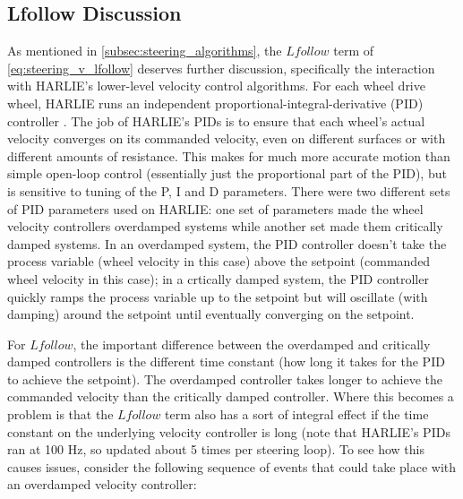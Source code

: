 \subsection{Lfollow Discussion}\label{subsec:lfollow_discussion_steering}

As mentioned in \autoref{subsec:steering_algorithms}, the $Lfollow$ term of \eqref{eq:steering_v_lfollow} deserves further discussion, specifically the interaction with HARLIE's lower-level velocity control algorithms. For each wheel drive wheel, HARLIE runs an independent proportional-integral-derivative (PID) controller . The job of HARLIE's PIDs is to ensure that each wheel's actual velocity converges on its commanded velocity, even on different surfaces or with different amounts of resistance. This makes for much more accurate motion than simple open-loop control (essentially just the proportional part of the PID), but is sensitive to tuning of the P, I and D parameters. There were two different sets of PID parameters used on HARLIE: one set of parameters made the wheel velocity controllers overdamped systems while another set made them critically damped systems. In an overdamped system, the PID controller doesn't take the process variable (wheel velocity in this case) above the setpoint (commanded wheel velocity in this case); in a crtically damped system, the PID controller quickly ramps the process variable up to the setpoint but will oscillate (with damping) around the setpoint until eventually converging on the setpoint.

For $Lfollow$, the important difference between the overdamped and critically damped controllers is the different time constant (how long it takes for the PID to achieve the setpoint). The overdamped controller takes longer to achieve the commanded velocity than the critically damped controller. Where this becomes a problem is that the $Lfollow$ term also has a sort of integral effect if the time constant on the underlying velocity controller is long (note that HARLIE's PIDs ran at 100 Hz, so updated about 5 times per steering loop). To see how this causes issues, consider the following sequence of events that could take place with an overdamped velocity controller:

